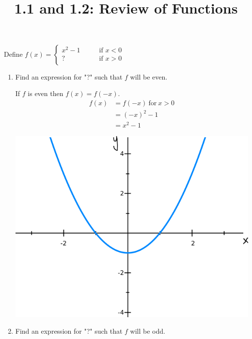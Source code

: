 \documentclass[nooutcomes]{ximera}
\title{1.1 and 1.2:  Review of Functions}
\begin{document}
\begin{abstract}		\end{abstract}
\maketitle


\begin{problem}
Define 
	$f(x) =   \left\{ \begin{array}{cl}
	x^2-1		 	&	\qquad \text{if } x < 0					\\
	\text{? }			&	\qquad \text{if }  x > 0 	\\		\end{array} \right.  $
\begin{enumerate}	
	\item  Find an expression for "?" such that $f$ will be even.
	
	\begin{freeResponse} 
			If $f$ is even then $f(x)=f(-x)$.  
			\begin{align*}
			f(x)&=f(-x)\ \text{for}\ x>0\\
			&=(-x)^2-1\\
			&=x^2-1	
			\end{align*}

	\begin{image}		
	\includegraphics[scale=.4]{figure11.png}
	\end{image}
		
	\end{freeResponse}
	
	\item  Find an expression for "?" such that $f$ will be odd.
	

\end{enumerate}
\end{problem}
\end{document}

